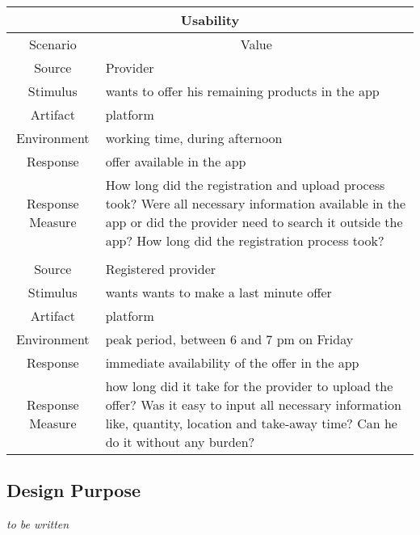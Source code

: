 \begin{table}[H]
    \begin{tabularx}{\textwidth}{|c|X|}
        \hline
        \multicolumn{2}{c}{\textbf{Usability}} \\
        \hline
        \toprule
        \multicolumn{1}{c}{Scenario} & \multicolumn{1}{c}{Value} \\
        \midrule
        Source & Provider \\
        Stimulus & wants to offer his remaining products in the app \\
        Artifact & platform \\
        Environment & working time, during afternoon \\
        Response & offer available in the app \\
        Response Measure & How long did the registration and upload process took? Were all necessary information
        available in the app or did the provider need to search it outside the app? How long did the registration
        process took? \\
         & \\
        Source & Registered provider \\
        Stimulus & wants wants to make a last minute offer \\
        Artifact & platform \\
        Environment & peak period, between 6 and 7 pm on Friday \\
        Response & immediate availability of the offer in the app \\
        Response Measure & how long did it take for the provider to upload the offer? Was it easy to input all
        necessary information like, quantity, location and take-away time? Can he do it without any burden? \\
        \bottomrule
    \end{tabularx}
\end{table}

\subsection{Design Purpose}

\textit{to be written}


